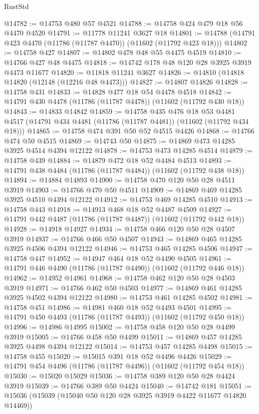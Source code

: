 \begin{lexlean}{RustStd}
\begin{coremodule}
@14782 := @14753 @480 @57 @4521
@14788 := @14758 @424 @479 @18 @56 @4470 @4520
@14791 := @11778 @11241 @3627 @18
@14801 := @14788 (@14791 @423 @4470 (@11786 (@11787 @4470)) (@11602 (@11792 @423 @18)))
@14802 := @14758 @427
@14807 := @14802 @478 @48 @55 @4475 @4519
@14810 := @14766 @427 @48 @4475
@14818 := @14742 @178 @48 @120 @28 @3925 @3919 @4473 @11677
@14820 := @11818 @11241 @3627
@14826 := @14810 (@14818 @14820 (@12148 (@12216 @48 @4473)))
@14827 := @14807 @14826
@14828 := @14758 @431
@14833 := @14828 @477 @18 @54 @4478 @4518
@14842 := @14791 @430 @4478 (@11786 (@11787 @4478)) (@11602 (@11792 @430 @18))
@14843 := @14833 @14842
@14859 := @14758
    @435
    @476
    @18
    @53
    @4481
    @4517
    (@14791 @434 @4481 (@11786 (@11787 @4481)) (@11602 (@11792 @434 @18)))
@14865 := @14758 @474 @391 @50 @52 @4515 @4426
@14868 := @14766 @474 @50 @4515
@14869 := @14743 @50
@14875 := @14869 @473 @14285 @3925 @4514 @4394 @12122
@14878 := @14753 @473 @14285 @4514
@14879 := @14758 @439
@14884 := @14879 @472 @18 @52 @4484 @4513
@14893 := @14791 @438 @4484 (@11786 (@11787 @4484)) (@11602 (@11792 @438 @18))
@14894 := @14884 @14893
@14900 := @14758 @470 @120 @50 @28 @4511 @3919
@14903 := @14766 @470 @50 @4511
@14909 := @14869 @469 @14285 @3925 @4510 @4394 @12122
@14912 := @14753 @469 @14285 @4510
@14913 := @14758 @443
@14918 := @14913 @468 @18 @52 @4487 @4509
@14927 := @14791 @442 @4487 (@11786 (@11787 @4487)) (@11602 (@11792 @442 @18))
@14928 := @14918 @14927
@14934 := @14758 @466 @120 @50 @28 @4507 @3919
@14937 := @14766 @466 @50 @4507
@14943 := @14869 @465 @14285 @3925 @4506 @4394 @12122
@14946 := @14753 @465 @14285 @4506
@14947 := @14758 @447
@14952 := @14947 @464 @18 @52 @4490 @4505
@14961 := @14791 @446 @4490 (@11786 (@11787 @4490)) (@11602 (@11792 @446 @18))
@14962 := @14952 @14961
@14968 := @14758 @462 @120 @50 @28 @4503 @3919
@14971 := @14766 @462 @50 @4503
@14977 := @14869 @461 @14285 @3925 @4502 @4394 @12122
@14980 := @14753 @461 @14285 @4502
@14981 := @14758 @451
@14986 := @14981 @460 @18 @52 @4493 @4501
@14995 := @14791 @450 @4493 (@11786 (@11787 @4493)) (@11602 (@11792 @450 @18))
@14996 := @14986 @14995
@15002 := @14758 @458 @120 @50 @28 @4499 @3919
@15005 := @14766 @458 @50 @4499
@15011 := @14869 @457 @14285 @3925 @4498 @4394 @12122
@15014 := @14753 @457 @14285 @4498
@15015 := @14758 @455
@15020 := @15015 @391 @18 @52 @4496 @4426
@15029 := @14791 @454 @4496 (@11786 (@11787 @4496)) (@11602 (@11792 @454 @18))
@15030 := @15020 @15029
@15036 := @14758 @389 @120 @50 @28 @4424 @3919
@15039 := @14766 @389 @50 @4424
@15040 := @14742 @181
@15051 := @15036 (@15039 (@15040 @50 @120 @28 @3925 @3919 @4422 @11677 @14820 @14469))

\end{coremodule}
\end{lexlean}
